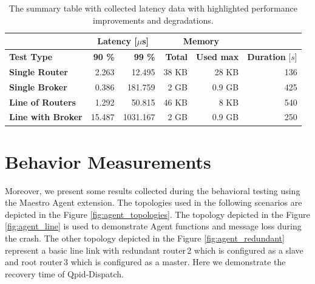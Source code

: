 \begingroup
\setlength{\tabcolsep}{10pt} %
\renewcommand{\arraystretch}{1.35} %
	\begin{table}[H]
	\centering
	\caption{The summary table with collected latency data with highlighted performance improvements and degradations.}
	\label{tab:latency-summary}
	\begin{tabular}{|l|r|r|r|r|r|}
	\hline
	\rowcolor[HTML]{C5E3DF}
	 & \multicolumn{2}{c|}{\textbf{Latency [$\mu$s]}} & \multicolumn{2}{c|}{\textbf{Memory}} &  \\ \hline
	\rowcolor[HTML]{C5E3DF}
	\textbf{Test Type} & \textbf{90 \%} & \textbf{99 \%} & \textbf{Total} & \textbf{Used max} & \textbf{Duration} [$s$] \\ \hline
	\textbf{Single Router} & 2.263 & 12.495 & 38 KB & 28 KB & \cellcolor[HTML]{9AFF99}136 \\ \hline
	\textbf{Single Broker} & 0.386 & 181.759 & 2 GB & 0.9 GB & \cellcolor[HTML]{FFCCC9}425 \\ \hline
	\textbf{Line of Routers} & \cellcolor[HTML]{9AFF99}1.292 & 50.815 & 46 KB & 8 KB & \cellcolor[HTML]{FFCCC9}540 \\ \hline
	\textbf{Line with Broker} & \cellcolor[HTML]{FFCCC9}15.487 & 1031.167 & 2 GB & 0.9 GB & \cellcolor[HTML]{9AFF99}250 \\ \hline
	\end{tabular}
	\end{table}
\endgroup


\section{Behavior Measurements}
\label{Behavior Measurements}
Moreover, we present some results collected during the behavioral testing using the Maestro Agent extension. The topologies used in the following scenarios are depicted in the Figure \ref{fig:agent_topologies}. The topology depicted in the Figure \ref{fig:agent_line} is used to demonstrate Agent functions and message loss during the crash. The other topology depicted in the Figure \ref{fig:agent_redundant} represent a basic line link with redundant router\,2 which is configured as a slave and root router\,3 which is configured as a master. Here we demonstrate the recovery time of Qpid-Dispatch.

